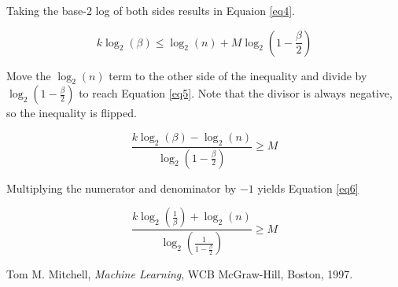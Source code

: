 \documentclass{article}
\begin{document}
Taking the base-2 log of both sides results in Equaion \ref{eq4}.

\begin{equation}\label{eq4}
k \log _2 \left( \beta \right) \le \log _2 \left( n \right) + M \log _2 \left( 1-\frac{\beta}{2} \right)
\end{equation}

Move the \(\log _2 \left( n \right)\) term to the other side of the inequality and divide by \(\log _2 \left( 1-\frac{\beta}{2} \right)\) to reach Equation \ref{eq5}. Note that the divisor is always negative, so the inequality is flipped.

\begin{equation}\label{eq5}
\frac{k \log _2 \left( \beta \right) - \log _2 \left( n \right)}{ \log _2 \left( 1-\frac{\beta}{2} \right) } \ge M 
\end{equation}

Multiplying the numerator and denominator by \(-1\) yields Equation \ref{eq6}

\begin{equation}\label{eq6}
\frac{k \log _2 \left( \frac{1}{\beta} \right) + \log _2 \left( n \right)}{ \log _2 \left( \frac{1}{1-\frac{\beta}{2}} \right) } \ge M 
\end{equation}

\begin{thebibliography}{9}

  Tom M. Mitchell,
  \emph{Machine Learning},
  WCB McGraw-Hill, Boston,
  1997.

\end{thebibliography}
\end{document}
